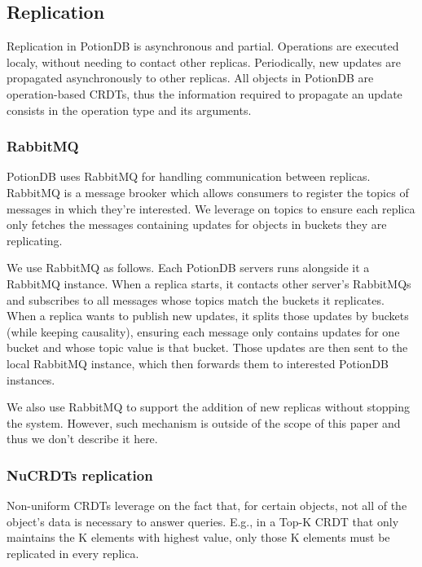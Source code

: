 \documentclass{vldb}
\begin{document}
\subsection{Replication}

Replication in PotionDB is asynchronous and partial.
Operations are executed localy, without needing to contact other replicas.
Periodically, new updates are propagated asynchronously to other replicas.
All objects in PotionDB are operation-based CRDTs, thus the information required to propagate an update consists in the operation type and its arguments.

\subsubsection{RabbitMQ}

PotionDB uses RabbitMQ \cite{???} for handling communication between replicas.
RabbitMQ is a message brooker which allows consumers to register the topics of messages in which they're interested.
We leverage on topics to ensure each replica only fetches the messages containing updates for objects in buckets they are replicating.

We use RabbitMQ as follows.
Each PotionDB servers runs alongside it a RabbitMQ instance.
When a replica starts, it contacts other server's RabbitMQs and subscribes to all messages whose topics match the buckets it replicates.
When a replica wants to publish new updates, it splits those updates by buckets (while keeping causality), ensuring each message only contains updates for one bucket and whose topic value is that bucket.
Those updates are then sent to the local RabbitMQ instance, which then forwards them to interested PotionDB instances.

We also use RabbitMQ to support the addition of new replicas without stopping the system.
However, such mechanism is outside of the scope of this paper and thus we don't describe it here.

\subsubsection{NuCRDTs replication}
\label{subsubsec:nureplication}

Non-uniform CRDTs \cite{???} leverage on the fact that, for certain objects, not all of the object's data is necessary to answer queries.
E.g., in a Top-K CRDT that only maintains the K elements with highest value, only those K elements must be replicated in every replica.
\end{document}
